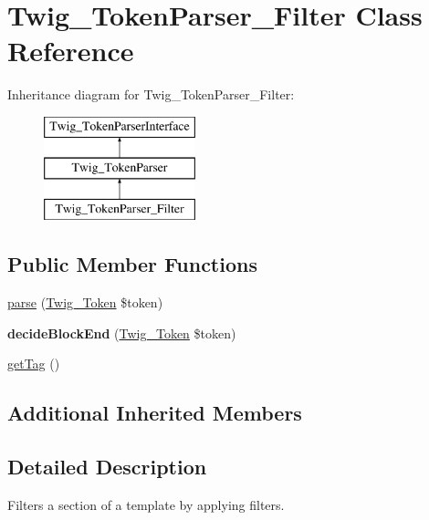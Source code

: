 \hypertarget{class_twig___token_parser___filter}{}\section{Twig\+\_\+\+Token\+Parser\+\_\+\+Filter Class Reference}
\label{class_twig___token_parser___filter}
Inheritance diagram for Twig\+\_\+\+Token\+Parser\+\_\+\+Filter\+:\begin{figure}[H]
\begin{center}
\leavevmode
\includegraphics[height=3.000000cm]{class_twig___token_parser___filter}
\end{center}
\end{figure}
\subsection*{Public Member Functions}
\begin{DoxyCompactItemize}
\item 
\hyperlink{class_twig___token_parser___filter_a5dfa2e269321584fb74e8b43dabe0efd}{parse} (\hyperlink{class_twig___token}{Twig\+\_\+\+Token} \$token)
\item 
\hypertarget{class_twig___token_parser___filter_aa976dc013d35c2813752149bacd88902}{}{\bfseries decide\+Block\+End} (\hyperlink{class_twig___token}{Twig\+\_\+\+Token} \$token)\label{class_twig___token_parser___filter_aa976dc013d35c2813752149bacd88902}

\item 
\hyperlink{class_twig___token_parser___filter_ab86ba36154b20e6bbfa3ba705f12f9d6}{get\+Tag} ()
\end{DoxyCompactItemize}
\subsection*{Additional Inherited Members}


\subsection{Detailed Description}
Filters a section of a template by applying filters.



